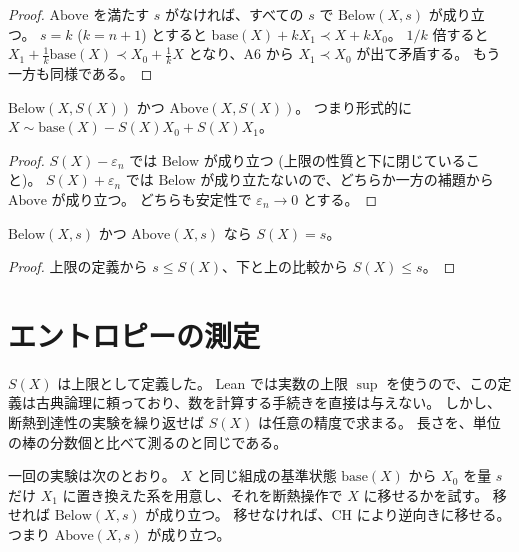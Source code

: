 \begin{proof}
  \leanok
  $\mathrm{Above}$ を満たす $s$ がなければ、すべての $s$ で $\mathrm{Below}(X, s)$ が成り立つ。
  $s = k$ ($k = n+1$) とすると $\mathrm{base}(X) + k X_1 \prec X + k X_0$。
  $1/k$ 倍すると $X_1 + \frac{1}{k} \mathrm{base}(X) \prec X_0 + \frac{1}{k} X$ となり、A6 から $X_1 \prec X_0$ が出て矛盾する。
  もう一方も同様である。
\end{proof}

\begin{lemma}[上限は達成される]
  \label{lem:attained}
  \leanok
  $\mathrm{Below}(X, S(X))$ かつ $\mathrm{Above}(X, S(X))$。
  つまり形式的に $X \sim \mathrm{base}(X) - S(X) X_0 + S(X) X_1$。
\end{lemma}

\begin{proof}
  \leanok
  $S(X) - \varepsilon_n$ では $\mathrm{Below}$ が成り立つ (上限の性質と下に閉じていること)。
  $S(X) + \varepsilon_n$ では $\mathrm{Below}$ が成り立たないので、どちらか一方の補題から $\mathrm{Above}$ が成り立つ。
  どちらも安定性で $\varepsilon_n \to 0$ とする。
\end{proof}

\begin{lemma}[エントロピーの特徴づけ]
  \label{lem:entropy-eq}
  \leanok
  $\mathrm{Below}(X, s)$ かつ $\mathrm{Above}(X, s)$ なら $S(X) = s$。
\end{lemma}

\begin{proof}
  \leanok
  上限の定義から $s \le S(X)$、下と上の比較から $S(X) \le s$。
\end{proof}

\section{エントロピーの測定}

$S(X)$ は上限として定義した。
Lean では実数の上限 $\sup$ を使うので、この定義は古典論理に頼っており、数を計算する手続きを直接は与えない。
しかし、断熱到達性の実験を繰り返せば $S(X)$ は任意の精度で求まる。
長さを、単位の棒の分数個と比べて測るのと同じである。

一回の実験は次のとおり。
$X$ と同じ組成の基準状態 $\mathrm{base}(X)$ から $X_0$ を量 $s$ だけ $X_1$ に置き換えた系を用意し、それを断熱操作で $X$ に移せるかを試す。
移せれば $\mathrm{Below}(X, s)$ が成り立つ。
移せなければ、CH により逆向きに移せる。つまり $\mathrm{Above}(X, s)$ が成り立つ。

